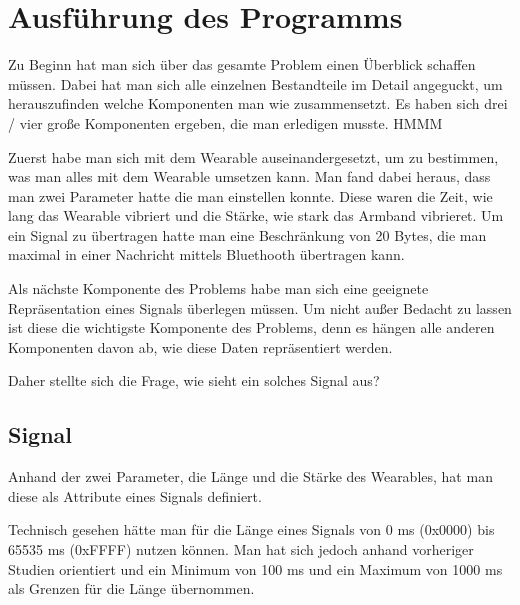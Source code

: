 
\section{Ausf{\"u}hrung des Programms}
\label{ch:Entwurf:sec:Ausf{\"u}hrung des Programms}

Zu Beginn hat man sich {\"u}ber das gesamte Problem einen {\"U}berblick schaffen m{\"u}ssen.
Dabei hat man sich alle einzelnen Bestandteile im Detail angeguckt, um herauszufinden welche Komponenten man wie zusammensetzt. 
Es haben sich drei / vier gro{\ss}e Komponenten ergeben, die man erledigen musste. HMMM 

Zuerst habe man sich mit dem Wearable auseinandergesetzt, um zu bestimmen, was man alles mit dem Wearable umsetzen kann.
Man fand dabei heraus, dass man zwei Parameter hatte die man einstellen konnte. Diese waren die Zeit, wie lang das Wearable vibriert und die St{\"a}rke, wie stark das Armband vibrieret.
Um ein Signal zu {\"u}bertragen hatte man eine Beschr{\"a}nkung von 20 Bytes, die man maximal in einer Nachricht mittels Bluethooth {\"u}bertragen kann.

Als n{\"a}chste Komponente des Problems habe man sich eine geeignete Repr{\"a}sentation eines Signals {\"u}berlegen m{\"u}ssen. Um nicht au{\ss}er Bedacht zu lassen ist diese die wichtigste Komponente des Problems, denn es h{\"a}ngen alle anderen Komponenten davon ab, wie diese Daten repr{\"a}sentiert werden. 

Daher stellte sich die Frage, wie sieht ein solches Signal aus?

\subsection{Signal}

Anhand der zwei Parameter, die L{\"a}nge und die St{\"a}rke des Wearables, hat man diese als Attribute eines Signals definiert.  

Technisch gesehen h{\"a}tte man f{\"u}r die L{\"a}nge eines Signals von 0 ms (0x0000) bis 65535 ms (0xFFFF) nutzen k{\"o}nnen. 
Man hat sich jedoch anhand vorheriger Studien \cite{pescara2016ruttelflug} orientiert und ein Minimum von 100 ms und ein Maximum von 1000 ms als Grenzen f{\"u}r die L{\"a}nge {\"u}bernommen.

